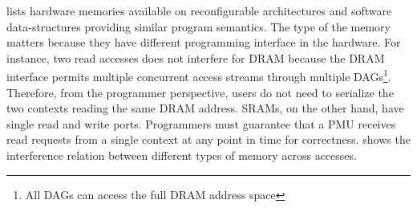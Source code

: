  lists hardware memories available on reconfigurable architectures and software
data-structures providing similar program semantics.
The type of the memory matters because they have different programming interface in the hardware.
For instance, two read accesses does not interfere for DRAM because the DRAM interface permits
multiple concurrent access streams through multiple DAGs\footnote{All DAGs can access the full DRAM
address space}. 
Therefore, from the programmer perspective, users do not need
to serialize the two contexts reading the same DRAM address. 
SRAMs, on the other hand, have single read 
and write ports. Programmers must guarantee that a PMU receives read requests from a single context
at any point in time for correctness.
 shows the interference relation between different types of memory across
accesses.

